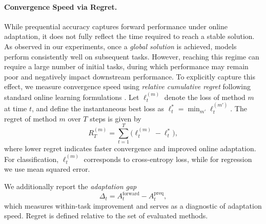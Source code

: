 \documentclass{article}
\begin{document}
\paragraph{Convergence Speed via Regret.}
While prequential accuracy captures forward performance under online adaptation, it does not fully reflect the time required to reach a stable solution. As observed in our experiments, once a \emph{global solution} is achieved, models perform consistently well on subsequent tasks. However, reaching this regime can require a large number of initial tasks, during which performance may remain poor and negatively impact downstream performance.
To explicitly capture this effect, we measure convergence speed using \emph{relative cumulative regret} following standard online learning formulations \citep{cesa2006prediction}. Let $\ell_t^{(m)}$ denote the loss of method $m$ at time $t$, and define the instantaneous best loss as $\ell_t^* = \min_{m'} \ell_t^{(m')}$. The regret of method $m$ over $T$ steps is given by
\[
R_T^{(m)} = \sum_{t=1}^{T} \bigl(\ell_t^{(m)} - \ell_t^*\bigr),
\]
where lower regret indicates faster convergence and improved online adaptation. For classification, $\ell_t^{(m)}$ corresponds to cross-entropy loss, while for regression we use mean squared error.

We additionally report the \emph{adaptation gap}
\[
\Delta_t = A_t^{\mathrm{forward}} - A_t^{\mathrm{preq}},
\]
which measures within-task improvement and serves as a diagnostic of adaptation speed. Regret is defined relative to the set of evaluated methods.
\end{document}
